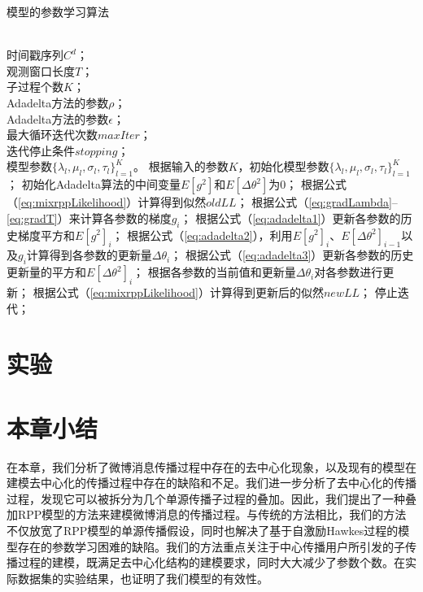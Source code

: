 \begin{algorithm}  
\caption{模型的参数学习算法}  
\label{alg:mixrppUpdate}  
\begin{algorithmic}[1]  
	\REQUIRE ~~\\
		时间戳序列$C^d$；\\
		观测窗口长度$T$；\\
		子过程个数$K$；\\
		Adadelta方法的参数$\rho$；\\
		Adadelta方法的参数$\epsilon$；\\
		最大循环迭代次数$maxIter$；\\
		迭代停止条件$stopping$；	
	\ENSURE ~~\\
		模型参数$\{\lambda_l,\mu_l,\sigma_l,\tau_l\}_{l=1}^K$。
	\vspace{2ex}
	\STATE 根据输入的参数$K$，初始化模型参数$\{\lambda_l,\mu_l,\sigma_l,\tau_l\}_{l=1}^K$；
	\STATE 初始化Adadelta算法的中间变量$E[g^2]$和$E[\Delta\theta^2]$为0；
	\STATE 根据公式（\ref{eq:mixrppLikelihood}）计算得到似然$oldLL$；
		\STATE 根据公式（\ref{eq:gradLambda}--\ref{eq:gradT}）来计算各参数的梯度$g_i$；
		\STATE 根据公式（\ref{eq:adadelta1}）更新各参数的历史梯度平方和$E[g^2]_i$；
		\STATE 根据公式（\ref{eq:adadelta2}），利用$E[g^2]_i$、$E[\Delta\theta^2]_{i-1}$以及$g_i$计算得到各参数的更新量$\Delta\theta_i$；
		\STATE 根据公式（\ref{eq:adadelta3}）更新各参数的历史更新量的平方和$E[\Delta\theta^2]_i$；
		\STATE 根据各参数的当前值和更新量$\Delta\theta_i$对各参数进行更新；
		\STATE 根据公式（\ref{eq:mixrppLikelihood}）计算得到更新后的似然$newLL$；
			\STATE 停止迭代；
		\ENDIF
	\ENDFOR
\end{algorithmic}  
\end{algorithm}  

\section{实验}
\section{本章小结}
在本章，我们分析了微博消息传播过程中存在的去中心化现象，以及现有的模型在建模去中心化的传播过程中存在的缺陷和不足。我们进一步分析了去中心化的传播过程，发现它可以被拆分为几个单源传播子过程的叠加。因此，我们提出了一种叠加RPP模型的方法来建模微博消息的传播过程。与传统的方法相比，我们的方法不仅放宽了RPP模型的单源传播假设，同时也解决了基于自激励Hawkes过程的模型存在的参数学习困难的缺陷。我们的方法重点关注于中心传播用户所引发的子传播过程的建模，既满足去中心化结构的建模要求，同时大大减少了参数个数。在实际数据集的实验结果，也证明了我们模型的有效性。